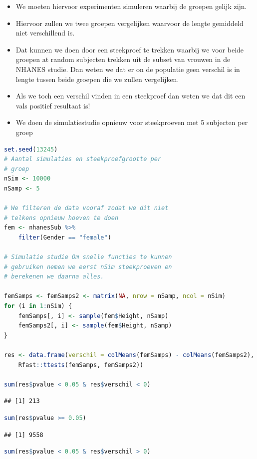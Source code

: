 \documentclass[
  12pt,dutch,coursenotes]{book}
\begin{document}
\begin{itemize}
\item
  We moeten hiervoor experimenten simuleren waarbij de groepen gelijk zijn.
\item
  Hiervoor zullen we twee groepen vergelijken waarvoor de lengte gemiddeld niet verschillend is.
\item
  Dat kunnen we doen door een steekproef te trekken waarbij we voor beide groepen at random subjecten trekken uit de subset van vrouwen in de NHANES studie. Dan weten we dat er on de populatie geen verschil is in lengte tussen beide groepen die we zullen vergelijken.
\item
  Als we toch een verschil vinden in een steekproef dan weten we dat dit een vals positief resultaat is!
\item
  We doen de simulatiestudie opnieuw voor steekproeven met 5 subjecten per groep
\end{itemize}

\begin{lstlisting}[language=R]
set.seed(13245)
# Aantal simulaties en steekproefgrootte per
# groep
nSim <- 10000
nSamp <- 5

# We filteren de data vooraf zodat we dit niet
# telkens opnieuw hoeven te doen
fem <- nhanesSub %>%
    filter(Gender == "female")

# Simulatie studie Om snelle functies te kunnen
# gebruiken nemen we eerst nSim steekproeven en
# berekenen we daarna alles.

femSamps <- femSamps2 <- matrix(NA, nrow = nSamp, ncol = nSim)
for (i in 1:nSim) {
    femSamps[, i] <- sample(fem$Height, nSamp)
    femSamps2[, i] <- sample(fem$Height, nSamp)
}

res <- data.frame(verschil = colMeans(femSamps) - colMeans(femSamps2),
    Rfast::ttests(femSamps, femSamps2))

sum(res$pvalue < 0.05 & res$verschil < 0)
\end{lstlisting}

\begin{lstlisting}
## [1] 213
\end{lstlisting}

\begin{lstlisting}[language=R]
sum(res$pvalue >= 0.05)
\end{lstlisting}

\begin{lstlisting}
## [1] 9558
\end{lstlisting}

\begin{lstlisting}[language=R]
sum(res$pvalue < 0.05 & res$verschil > 0)
\end{lstlisting}
\end{document}
